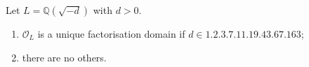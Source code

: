 \begin{theorem}
    Let \( L = \mathbb Q(\sqrt{-d}) \) with \( d > 0 \).
    \begin{enumerate}
        \item \( \mathcal O_L \) is a unique factorisation domain if \( d \in \qty{1, 2, 3, 7, 11, 19, 43, 67, 163} \);
        \item there are no others.
    \end{enumerate}
\end{theorem}
